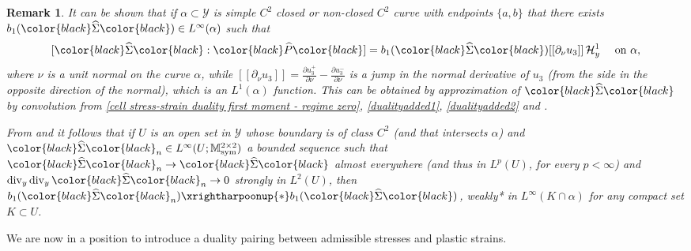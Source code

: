 \documentclass[reqno,10pt]{amsart}
\numberwithin{equation}{section}
\newtheorem{remark}[theorem]{Remark}
\theoremstyle{remark}
\newcommand{\BLACK}{\color{black}}
\newcommand{\PINK}{\color{black}}
\newcommand{\calH}{\mathcal{H}}
\newcommand{\calY}{\mathcal{Y}}
\DeclareMathOperator{\sym}{sym}
\newcommand{\weakstar}{\xrightharpoonup{*}}
\renewcommand{\div}{\operatorname{div}}
\newcommand{\firstI}[1]{\widehat{#1}}
\begin{document}
\begin{remark} \label{remadd2}
It can be shown that if $\alpha \subset \calY$ is simple $C^2$ closed or non-closed $C^2$ curve with endpoints $\{a,b\}$ that there exists $b_1({\PINK\firstI{\Sigma}\BLACK}) \in L^{\infty} (\alpha) $ such that
\begin{equation} \label{curve1} 
	[{\PINK\firstI{\Sigma}\BLACK}:{\PINK\firstI{P}\BLACK}] = b_1({\PINK\firstI{\Sigma}\BLACK}) [[\partial_{\nu}u_3]] \,\calH^{1}_{y} \quad \textrm{ on } \alpha,
\end{equation} 
where $\nu$ is a unit normal on the curve $\alpha$, while $[[\partial_{\nu}u_3]] = \frac{\partial u_3^{+}}{\partial\nu} - \frac{\partial u_3^{-}}{\partial\nu}$ is a jump in the normal derivative of $u_3$ (from the side in the opposite direction of the normal), which is an $L^1 (\alpha)$ function. This
can be obtained by approximation of ${\PINK\firstI{\Sigma}\BLACK}$ by convolution from \eqref{cell stress-strain duality first moment - regime zero}, \eqref{dualityadded1}, \eqref{dualityadded2} 
and \cite[Th\'{e}oreme 2.1]{Demengel.1984}.

From \cite[Section 7.1]{Davoli.Mora.2013} and \cite[Th\'{e}oreme 2.1 and Appendice, Th\'{e}oreme 1]{Demengel.1984} it follows that if $U$ is an open set in $\calY$ whose boundary is of class $C^2$ (and that intersects $\alpha$) and ${\PINK\firstI{\Sigma}\BLACK}_n \in L^\infty(U;\mathbb{M}_{\sym}^{2 \times 2})$ a bounded sequence such that ${\PINK\firstI{\Sigma}\BLACK}_n \to {\PINK\firstI{\Sigma}\BLACK}$ almost everywhere (and thus in $L^p(U)$, for every $p<\infty$) and $\div_y \div_y {\PINK\firstI{\Sigma}\BLACK}_n\to 0$ strongly in $L^2(U)$, then $b_1({\PINK\firstI{\Sigma}\BLACK}_n) \weakstar b_1({\PINK\firstI{\Sigma}\BLACK})$, weakly* in $L^{\infty}(K \cap \alpha)$ for any compact set $K \subset U$. 
\end{remark}

We are now in a position to introduce a duality pairing between admissible stresses and plastic strains. 
\end{document}
